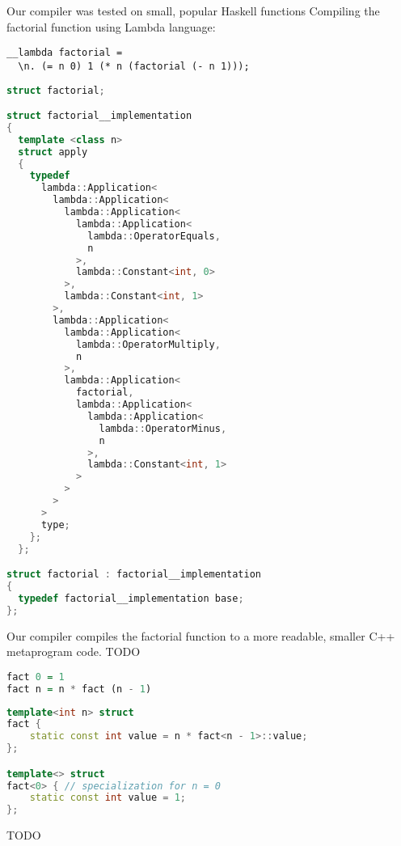 \documentclass{article}
\begin{document}
\begin{comment}
HASKELL CODE\\
\centerline{\Bigg\Downarrow}
C++ CODE
\end{comment}
Our compiler was tested on small, popular Haskell functions\cite{bartoszhaskell}
Compiling the factorial function using Lambda language:
\begin{center}
\begin{lstlisting}
__lambda factorial =
  \n. (= n 0) 1 (* n (factorial (- n 1)));
\end{lstlisting}
\Bigg\Downarrow
\begin{lstlisting}[language=C++]
struct factorial;

struct factorial__implementation
{
  template <class n>
  struct apply
  {
    typedef
      lambda::Application<
        lambda::Application<
          lambda::Application<
            lambda::Application<
              lambda::OperatorEquals,
              n
            >,
            lambda::Constant<int, 0>
          >,
          lambda::Constant<int, 1>
        >,
        lambda::Application<
          lambda::Application<
            lambda::OperatorMultiply,
            n
          >,
          lambda::Application<
            factorial,
            lambda::Application<
              lambda::Application<
                lambda::OperatorMinus,
                n
              >,
              lambda::Constant<int, 1>
            >
          >
        >
      >
      type;
    };
  };

struct factorial : factorial__implementation
{
  typedef factorial__implementation base;
};
\end{lstlisting}
\end{center}

Our compiler compiles the factorial function to a more readable, smaller C++ metaprogram code.
TODO
\begin{center}
\begin{lstlisting}[language=Haskell]
fact 0 = 1
fact n = n * fact (n - 1)
\end{lstlisting}
\Bigg\Downarrow
\begin{lstlisting}[language=C++]
template<int n> struct
fact {
    static const int value = n * fact<n - 1>::value;
};

template<> struct
fact<0> { // specialization for n = 0
    static const int value = 1;
};
\end{lstlisting}
\end{center}
TODO
\end{document}
